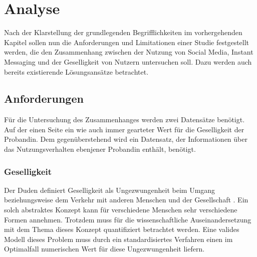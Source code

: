 
\chapter{Analyse}
\label{ch:Analyse}

Nach der Klarstellung der grundlegenden Begrifflichkeiten im vorhergehenden Kapitel
sollen nun die Anforderungen und Limitationen einer Studie festgestellt werden, die den
Zusammenhang zwischen der Nutzung von Social Media, Instant Messaging und der Geselligkeit
von Nutzern untersuchen soll. 
Dazu werden auch bereits existierende Lösungsansätze betrachtet. 

\section{Anforderungen}
\label{ch:Analyse:sec:Anforderungen}


Für die Untersuchung des Zusammenhanges werden zwei Datensätze benötigt.
Auf der einen Seite ein wie auch immer gearteter Wert für die Geselligkeit der Probandin. 
Dem gegenüberstehend wird ein Datensatz, der Informationen über das Nutzungsverhalten ebenjener Probandin enthält, benötigt.
\par

\subsection{Geselligkeit}

Der Duden definiert Geselligkeit als Ungezwungenheit beim Umgang beziehungsweise dem Verkehr mit anderen Menschen und der Gesellschaft \cite{dudengesell}.
Ein solch abstraktes Konzept kann für verschiedene Menschen sehr verschiedene Formen annehmen.
Trotzdem muss für die wissenschaftliche Auseinandersetzung mit dem Thema dieses Konzept quantifiziert betrachtet werden.
Eine valides Modell dieses Problem muss durch ein standardisiertes Verfahren einen im Optimalfall numerischen Wert für diese Ungezwungenheit liefern. 
\par

